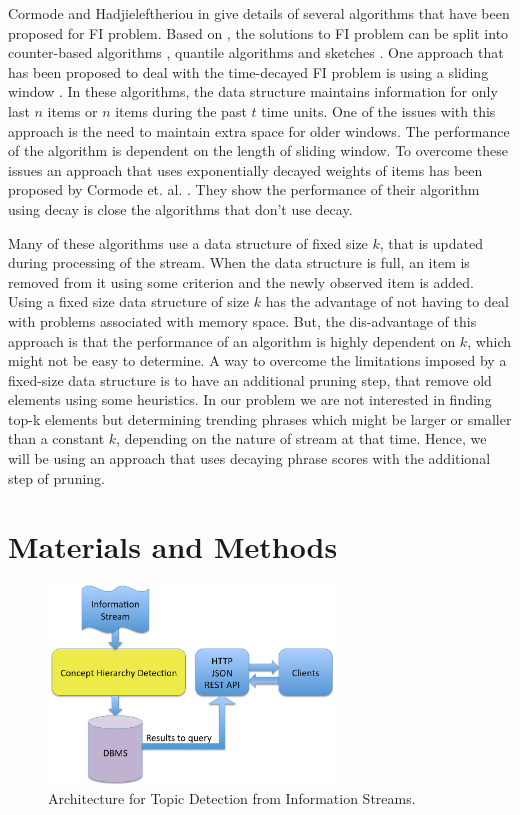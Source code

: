 \documentclass{sig-alternate}
\begin{document}
Cormode and Hadjieleftheriou in \cite{Cormode:2010:fi_survey} give details of several algorithms that have been proposed for FI problem. Based on \cite{Cormode:2010:fi_survey}, the solutions to FI problem can be split into counter-based algorithms \cite{Misra:1982:fi, Manku:2002:fi, Metwally:2005:fi}, quantile algorithms \cite{Greenwald:2001:fi, Shrivastava:2004:fi} and sketches \cite{Charikar:2002:fi}.  One approach that has been proposed to deal with the time-decayed FI problem is using a sliding window \cite{Datar:2002:fi, Arasu:2004:fi, Lee:2006:fi}. In these algorithms, the data structure maintains information for only last $n$ items or $n$ items during the past $t$ time units. One of the issues with this approach is the need to maintain extra space for older windows. The performance of the algorithm is dependent on the length of sliding window. To overcome these issues an approach that uses  exponentially decayed weights of items has been proposed by Cormode et. al. \cite{Cormode:2008:fi}. They show the performance of their algorithm using decay is close the algorithms that don't use decay.

Many of these algorithms use a data structure of fixed size $k$, that is updated during processing of the stream. When the data structure is full, an item is removed from it using some criterion and the newly observed item is added. Using a fixed size data structure of size $k$ has the advantage of not having to deal with problems associated with memory space. But, the dis-advantage of this approach is that the performance of an algorithm is highly dependent on $k$, which might not be easy to determine. A way to overcome the limitations imposed by a fixed-size data structure is to have an additional pruning step, that remove old elements using some heuristics. In our problem we are not interested in finding top-k elements but determining trending phrases which might be larger or smaller than a constant $k$, depending on the nature of stream at that time.  Hence, we will be using
an approach that uses decaying phrase scores with the additional step of pruning.

\section{Materials and Methods}
\begin{figure}
\begin{center}
\includegraphics[width=3.0in]{images/architecture}
\caption{Architecture for Topic Detection from Information Streams.}
\label{fig:architecture}
\end{center}
\end{figure}
\end{document}
